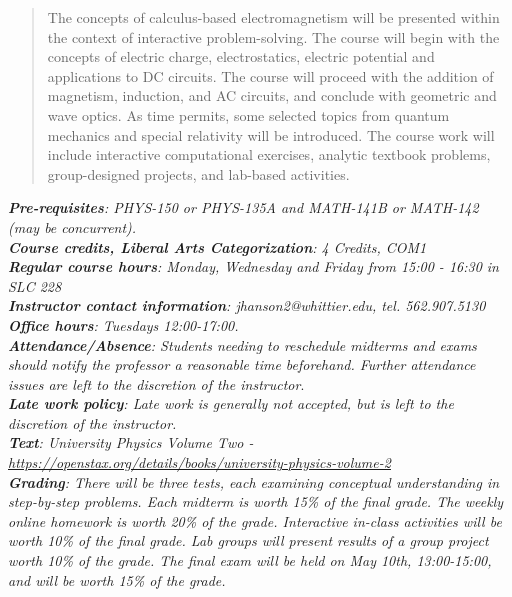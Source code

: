 \documentclass[10pt]{article}
\begin{document}
\maketitle

\begin{abstract}
The concepts of calculus-based electromagnetism will be presented within the context of interactive problem-solving.  The course will begin with the concepts of electric charge, electrostatics, electric potential and applications to DC circuits.  The course will proceed with the addition of magnetism, induction, and AC circuits, and conclude with geometric and wave optics.  As time permits, some selected topics from quantum mechanics and special relativity will be introduced.  The course work will include interactive computational exercises, analytic textbook problems, group-designed projects, and lab-based activities.
\end{abstract}
\noindent
\textit{\textbf{Pre-requisites}: PHYS-150 or PHYS-135A and MATH-141B or MATH-142 (may be concurrent).} \\
\textit{\textbf{Course credits, Liberal Arts Categorization}: 4 Credits, COM1} \\
\textit{\textbf{Regular course hours}: Monday, Wednesday and Friday from 15:00 - 16:30 in SLC 228} \\
\textit{\textbf{Instructor contact information}: jhanson2@whittier.edu, tel. 562.907.5130} \\
\textit{\textbf{Office hours}: Tuesdays 12:00-17:00.} \\
\textit{\textbf{Attendance/Absence}: Students needing to reschedule midterms and exams should notify the professor a reasonable time beforehand. Further attendance issues are left to the discretion of the instructor}.\\ 
\textit{\textbf{Late work policy}: Late work is generally not accepted, but is left to the discretion of the instructor.} \\
\textit{\textbf{Text}: University Physics Volume Two - \url{https://openstax.org/details/books/university-physics-volume-2}} \\
\textit{\textbf{Grading}: There will be three tests, each examining conceptual understanding in step-by-step problems. Each
midterm is worth 15\% of the final grade. The weekly online homework is worth 20\% of the grade. Interactive
in-class activities will be worth 10\% of the final grade. Lab groups will present results of a group project worth 10\% of the grade.  The final exam will be held on May 10th, 13:00-15:00, and will be worth 15\% of the grade.} \\
\end{document}
